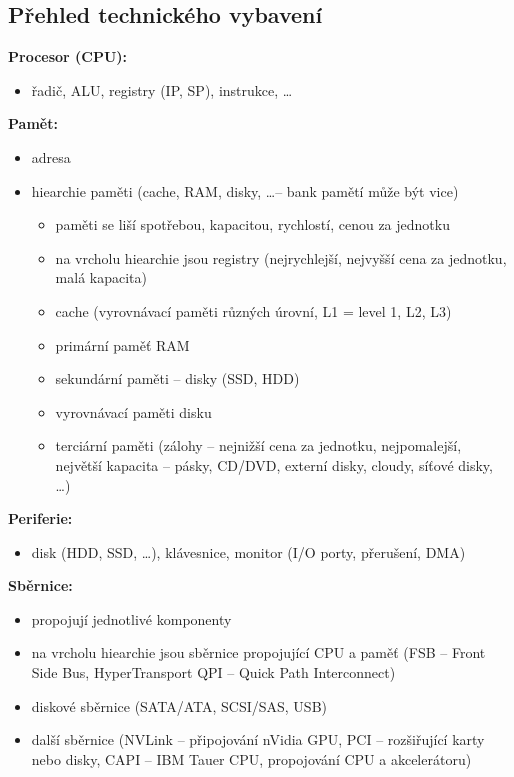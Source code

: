 \documentclass[a4paper, 11pt]{article}
\begin{document}
\subsection{Přehled technického vybavení}

\textbf{Procesor (CPU):}
\begin{itemize}
    \item řadič, ALU, registry (IP, SP), instrukce, \ldots
\end{itemize}

\textbf{Pamět:} \label{hiearchie-pameti}
\begin{itemize}
    \item adresa
    \item hiearchie paměti (cache, RAM, disky, \ldots -- bank pamětí může být vice)
    \begin{itemize}
        \item paměti se liší spotřebou, kapacitou, rychlostí, cenou za jednotku
        \item na vrcholu hiearchie jsou registry (nejrychlejší, nejvyšší cena za jednotku, malá kapacita)
        \item cache (vyrovnávací paměti různých úrovní, L1 = level 1, L2, L3)
        \item primární paměť RAM
        \item sekundární paměti -- disky (SSD, HDD)
        \item vyrovnávací paměti disku
        \item terciární paměti (zálohy -- nejnižší cena za jednotku, nejpomalejší, největší kapacita -- pásky, CD/DVD, externí disky, cloudy, síťové disky, \ldots)
    \end{itemize}
\end{itemize}

\textbf{Periferie:}
\begin{itemize}
    \item disk (HDD, SSD, \ldots), klávesnice, monitor (I/O porty, přerušení, DMA)
\end{itemize}

\newpage
\textbf{Sběrnice:}
\begin{itemize}
    \item propojují jednotlivé komponenty
    \item na vrcholu hiearchie jsou sběrnice propojující CPU a paměť (FSB -- Front Side Bus, HyperTransport QPI -- Quick Path Interconnect)
    \item diskové sběrnice (SATA/ATA, SCSI/SAS, USB)
    \item další sběrnice (NVLink -- připojování nVidia GPU, PCI -- rozšiřující karty nebo disky, CAPI -- IBM Tauer CPU, propojování CPU a akcelerátoru)
\end{itemize}
 
\end{document}
